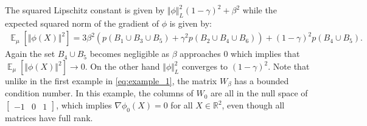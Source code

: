 \documentclass{article}
\DeclareMathOperator{\E}{\mathbb E}
\newcommand{\R}{\mathbb R}
\begin{document}
The squared Lipschitz constant is given by $\Vert \phi \Vert_{L}^2 (1-\gamma)^2+\beta^2$ while the expected squared norm of the gradient of $\phi$ is given by:
\begin{align}
  \E_{\mu}[\Vert \phi(X) \Vert^2] = 3\beta^2(p(B_1\cup B_3\cup B_5)+ \gamma^2 p(B_2\cup B_4\cup B_6)) + (1-\gamma)^2p(B_4\cup B_5).
\end{align}
Again the set $B_4\cup B_5$ becomes negligible as $\beta$ approaches $0$ which implies that  $\E_{\mu}[\Vert \phi(X) \Vert^2] \rightarrow 0$. On the other hand $\Vert \phi \Vert_{L}^2 $ converges to $(1-\gamma)^2$.  Note that unlike in the first example in \cref{eq:example_1}, the matrix $W_{\beta}$ has a bounded condition number. In this example, the columns of $W_{0}$  are all in the null space of $\begin{bmatrix}-1 & 0 & 1\end{bmatrix}$, which implies $\nabla\phi_0(X)=0$ for all $X\in \R^2$, even though all matrices have full rank.
\end{document}
